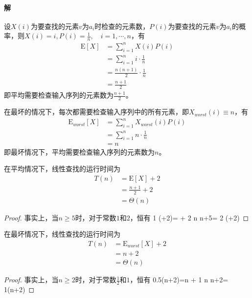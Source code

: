 \documentclass{article}
\begin{document}
\paragraph{解}
设$X(i)$为要查找的元素$v$为$a_i$时检查的元素数，$P(i)$为要查找的元素$v$为$a_i$的概率，则$X(i)=i,P(i)=\displaystyle \frac{1}{n},\quad i=1,\cdots,n$，有
\begin{align*}
    \mathrm{E}[X]&=\sum_{i=1}^n{X(i)P(i)} \\
    &=\sum_{i=1}^n{i \cdot \frac{1}{n}} \\
    &=\frac{n(n+1)}{2}\cdot\frac{1}{n} \\
    &=\frac{n+1}{2}
\end{align*}
即平均需要检查输入序列的元素数为$\displaystyle \frac{n+1}{2}$。\par
在最坏的情况下，每次都需要检查输入序列中的所有元素，即$X_{worst}(i) \equiv n$，有
\begin{align*}
    \mathrm{E}_{worst}[X]&=\sum_{i=1}^n{X_{worst}(i)P(i)} \\
    &=\sum_{i=1}^n{n \cdot \frac{1}{n}} \\
    &=n
\end{align*}
即最坏情况下，平均需要检查输入序列的元素数为$n$。\par
在平均情况下，线性查找的运行时间为
\begin{align*}
    T(n)&=\mathrm{E}[X]+2 \\
    &=\frac{n+1}{2} +2 \\
    &=\Theta(n)
\end{align*} \par
\begin{proof}
    事实上，当$n \geq 5$时，对于常数$1$和$2$，恒有
    1 \cdot (+2)= + 2 \leq n \leq n+5= 2 \cdot (+2)
\end{proof} \par
在最坏情况下，线性查找的运行时间为
\begin{align*}
    T(n)&=\mathrm{E}_{worst}[X]+2 \\
    &=n+2 \\
    &=\Theta(n)
\end{align*} \par
\begin{proof}
    事实上，当$n \geq 2$时，对于常数$\displaystyle \frac{1}{2}$和$1$，恒有
    0.5\cdot(n+2)=\cdot n + 1 \leq n \leq n+2= 1\cdot(n+2)
\end{proof} \par
\end{document}
